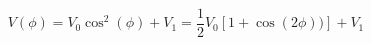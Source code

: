 \begin{equation}
\label{eq:Photodiode_Voltage}
V(\phi) = V_{0} \cos^2(\phi)+ V_{1} = \frac{1}{2}V_0\left[1 + \cos(2 \phi))\right]+ V_1
\end{equation}